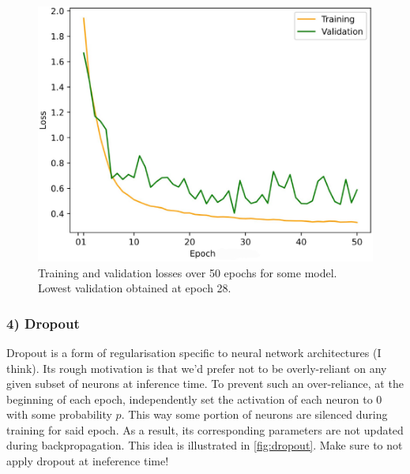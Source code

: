 \documentclass[11pt]{article}
\begin{document}
\begin{figure}[t]
    \centering
    \begin{minipage}{0.55\linewidth}
        \includegraphics[width=\linewidth]{./figures/neural_nets/REG_early_stopping.pdf}
    \end{minipage}%
    \hfill
    \begin{minipage}{0.43\linewidth}
        \caption{Training and validation losses over 50 epochs for some model. Lowest validation obtained at epoch 28.}
        \label{fig:early_stopping}
    \end{minipage}
\end{figure}

\subsubsection*{4) Dropout} Dropout is a form of regularisation specific to neural network architectures (I think). Its rough motivation is that we'd prefer not to be overly-reliant on any given subset of neurons at inference time. To prevent such an over-reliance, at the beginning of each epoch, independently set the activation of each neuron to 0 with some probability $p$. This way some portion of neurons are silenced during training for said epoch. As a result, its corresponding parameters are not updated during backpropagation. This idea is illustrated in \autoref{fig:dropout}. Make sure to not apply dropout at ineference time!
\end{document}
